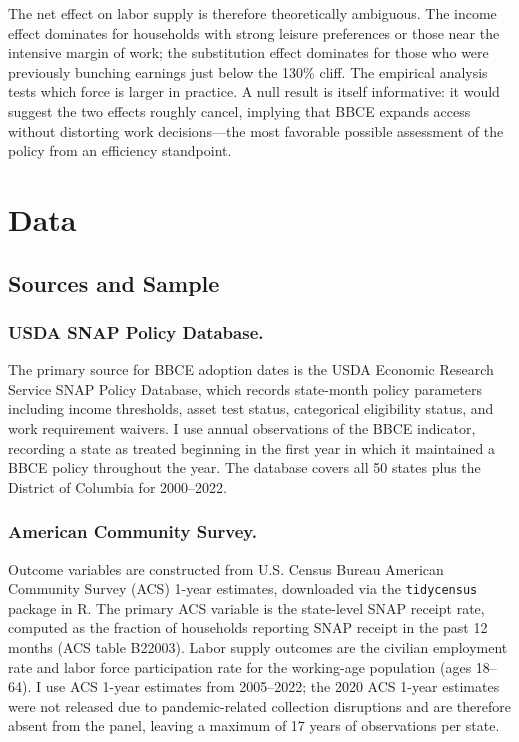 \documentclass[12pt]{article}
\begin{document}
The net effect on labor supply is therefore theoretically ambiguous. The income effect dominates for households with strong leisure preferences or those near the intensive margin of work; the substitution effect dominates for those who were previously bunching earnings just below the 130\% cliff. The empirical analysis tests which force is larger in practice. A null result is itself informative: it would suggest the two effects roughly cancel, implying that BBCE expands access without distorting work decisions---the most favorable possible assessment of the policy from an efficiency standpoint.

\section{Data}

\subsection{Sources and Sample}

\subsubsection*{USDA SNAP Policy Database.} The primary source for BBCE adoption dates is the USDA Economic Research Service SNAP Policy Database, which records state-month policy parameters including income thresholds, asset test status, categorical eligibility status, and work requirement waivers. I use annual observations of the BBCE indicator, recording a state as treated beginning in the first year in which it maintained a BBCE policy throughout the year. The database covers all 50 states plus the District of Columbia for 2000--2022.

\subsubsection*{American Community Survey.} Outcome variables are constructed from U.S. Census Bureau American Community Survey (ACS) 1-year estimates, downloaded via the \texttt{tidycensus} package in R. The primary ACS variable is the state-level SNAP receipt rate, computed as the fraction of households reporting SNAP receipt in the past 12 months (ACS table B22003). Labor supply outcomes are the civilian employment rate and labor force participation rate for the working-age population (ages 18--64). I use ACS 1-year estimates from 2005--2022; the 2020 ACS 1-year estimates were not released due to pandemic-related collection disruptions and are therefore absent from the panel, leaving a maximum of 17 years of observations per state.
\end{document}
